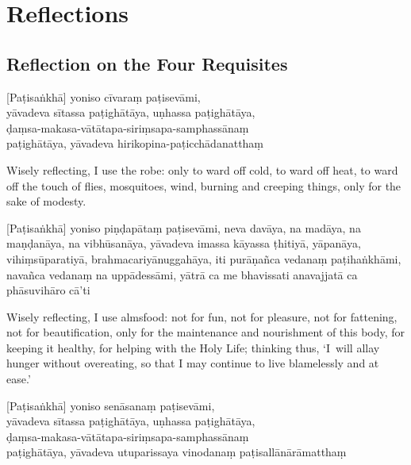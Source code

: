 \chapter{Reflections}

\section{Reflection on the Four Requisites}

\begin{leader}
\end{leader}


[Paṭisaṅkhā] yoniso cīvaraṃ paṭisevāmi,\\
yāvadeva sītassa paṭighātāya, uṇhassa paṭighātāya,\\
ḍaṃsa-makasa-vātātapa-siriṃsapa-samphassānaṃ\\
paṭighātāya, yāvadeva hirikopina-paṭicchādanatthaṃ

\begin{english}
  Wisely reflecting, I use the robe: only to ward off cold, to ward off heat, to
  ward off the touch of flies, mosquitoes, wind, burning and creeping things,
  only for the sake of modesty.
\end{english}

[Paṭisaṅkhā] yoniso piṇḍapātaṃ paṭisevāmi, neva davāya, na madāya, na maṇḍanāya,
na vibhūsanāya, yāvadeva imassa kāyassa ṭhitiyā, yāpanāya, vihiṃsūparatiyā,
brahmacariyānuggahāya, iti purāṇañca vedanaṃ paṭihaṅkhāmi, navañca vedanaṃ na
uppādessāmi, yātrā ca me bhavissati anavajjatā ca phāsuvihāro cā'ti

\begin{english}
  Wisely reflecting, I use almsfood: not for fun, not for pleasure, not for
  fattening, not for beautification, only for the maintenance and nourishment of
  this body, for keeping it healthy, for helping with the Holy Life; thinking
  thus, `I~will allay hunger without overeating, so that I may continue to live
  blamelessly and at ease.'
\end{english}

[Paṭisaṅkhā] yoniso senāsanaṃ paṭisevāmi,\\
yāvadeva sītassa paṭighātāya, uṇhassa paṭighātāya,\\
ḍaṃsa-makasa-vātātapa-siriṃsapa-samphassānaṃ\\
paṭighātāya, yāvadeva utuparissaya vinodanaṃ paṭisallānārāmatthaṃ

